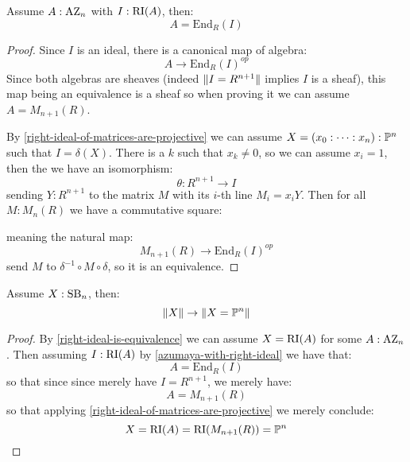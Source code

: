 
\begin{lemma}\label{azumaya-with-right-ideal}
Assume $A:\mathrm{AZ}_n$ with $I:\mathrm{RI}(A)$, then:
\[A = \mathrm{End}_R(I)\]
\end{lemma}

\begin{proof}
Since $I$ is an ideal, there is a canonical map of algebra:
\[A \to\mathrm{End}_R(I)^{op}\]
Since both algebras are sheaves (indeed $\lVert I=R^{n+1} \rVert$ implies $I$ is a sheaf), this map being an equivalence is a sheaf so when proving it we can assume $A=M_{n+1}(R)$.

By \cref{right-ideal-of-matrices-are-projective} we can assume $X=(x_0:\cdots:x_n):\mathbb{P}^n$ such that $I=\delta(X)$. There is a $k$ such that $x_k\not=0$, so we can assume $x_i=1$, then the we have an isomorphism:
\[\theta:R^{n+1}\to I\]
sending $Y:R^{n+1}$ to the matrix $M$ with its $i$-th line $M_i=x_iY$. Then for all $M:M_n(R)$ we have a commutative square:
\begin{center}
\end{center}
meaning the natural map:
\[ M_{n+1}(R)\to \mathrm{End}_R(I)^{op}\]
send $M$ to $\delta^{-1}\circ M\circ\delta$, so it is an equivalence.
\end{proof}



\begin{theorem}
Assume $X:\mathrm{SB}_n$, then:
\[\lVert X \rVert\to\lVert X=\mathbb{P}^n \rVert\]
\end{theorem}

\begin{proof}
By \cref{right-ideal-is-equivalence} we can assume $X=\mathrm{RI}(A)$ for some $A:\mathrm{AZ}_n$. Then assuming $I:\mathrm{RI}(A)$ by \cref{azumaya-with-right-ideal} we have that:
\[A=\mathrm{End}_R(I)\]
so that since since merely have $I=R^{n+1}$, we merely have:
\[A = M_{n+1}(R)\]
so that applying \cref{right-ideal-of-matrices-are-projective} we merely conclude:
\[X=\mathrm{RI}(A)=\mathrm{RI}(M_{n+1}(R)) = \mathbb{P}^n\]
\end{proof}